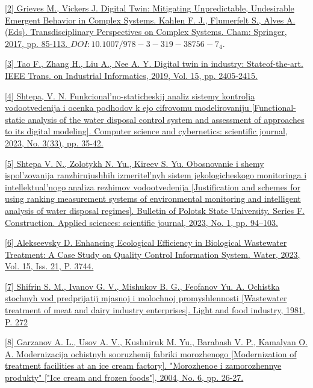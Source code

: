 \documentclass{article}
\begin{document}
\begin{multicols}{2}
\begin{thebibliography}{10}
\begin{description}
\item \href{http://www.overleaf.xn--com}{
[2] Grieves M., Vickers J. Digital Twin: Mitigating Unpredictable,
Undesirable Emergent Behavior in Complex Systems. Kahlen
F. J., Flumerfelt S., Alves A. (Eds). Transdisciplinary Perspectives on Complex Systems. Cham: Springer, 2017, pp. 85-113.
$DOI:10.1007/978-3-319-38756- 7_4.$}
\item \href{http://www.overleaf.xn--com}{
[3] Tao F., Zhang H., Liu A., Nee A. Y. Digital twin in industry: Stateof-the-art. IEEE Trans. on Industrial Informatics, 2019, Vol. 15,
pp. 2405-2415.}
\item \href{http://www.overleaf.xn--com}{
[4] Shtepa, V. N. Funkcional’no-staticheskij analiz sistemy kontrolja vodootvedenija i ocenka podhodov k ejo cifrovomu modelirovaniju [Functional-static analysis of the water disposal control system and assessment of approaches to its digital modeling]. Computer science and cybernetics: scientific journal, 2023,
No. 3(33), pp. 35-42.}
\item \href{http://www.overleaf.xn--com}{
[5] Shtepa V. N., Zolotykh N. Yu., Kireev S. Yu. Obosnovanie i
shemy ispol’zovanija ranzhirujushhih izmeritel’nyh sistem jekologicheskogo monitoringa i intellektual’nogo analiza rezhimov
vodootvedenija [Justification and schemes for using ranking measurement systems of environmental monitoring and intelligent
analysis of water disposal regimes]. Bulletin of Polotsk State
University. Series F. Construction. Applied sciences: scientific
journal, 2023, No. 1, pp. 94–103.}
\item \href{http://www.overleaf.xn--com}{
[6] Alekseevsky D. Enhancing Ecological Efficiency in Biological
Wastewater Treatment: A Case Study on Quality Control Information System. Water, 2023, Vol. 15, Iss. 21, P. 3744.}
\item \href{http://www.overleaf.xn--com}{
[7] Shifrin S. M., Ivanov G. V., Mishukov B. G., Feofanov Yu. A.
Ochistka stochnyh vod predprijatij mjasnoj i molochnoj promyshlennosti [Wastewater treatment of meat and dairy industry enterprises]. Light and food industry, 1981, P. 272} 
\item \href{http://www.overleaf.xn--com}{
[8] Garzanov A. L., Usov A. V., Kushniruk M. Yu., Barabash V. P.,
Kamalyan O. A. Modernizacija ochistnyh sooruzhenij fabriki
morozhenogo [Modernization of treatment facilities at an ice
cream factory]. "Morozhenoe i zamorozhennye produkty" ["Ice
cream and frozen foods"], 2004, No. 6, pp. 26-27.}
\item \href{http://www.overleaf.xn--com}{
}
\end{description}
\end{thebibliography}
\end{multicols}
\end{document}
